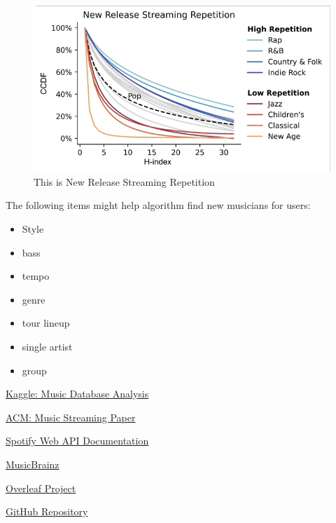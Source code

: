 \documentclass[runningheads]{llncs}
\begin{document}
\begin{figure}
\includegraphics[width=\textwidth]{Streaming 1.jpg}
\caption{This is New Release Streaming Repetition} 
\label{mecFig}
\end{figure}

%
%


The following items might help algorithm find new musicians for users:
\begin{itemize}
    \item Style
    \item bass
    \item tempo
    \item genre
    \item tour lineup
    \item single artist
    \item group
\end{itemize}
    

%
%



\href{https://www.kaggle.com/code/caitlyna/music-database-analysis}{Kaggle: Music Database Analysis}

\href{https://dl.acm.org/doi/fullHtml/10.1145/3614419.3644002}{ACM: Music Streaming Paper}

\href{https://developer.spotify.com/documentation/web-api}{Spotify Web API Documentation}

\href{https://musicbrainz.org/}{MusicBrainz}

\href{https://www.overleaf.com/project/671af4c6d1ae0a41998555c6}{Overleaf Project}

\href{https://github.com/anythonyschomer/capstoneproject}{GitHub Repository}
\end{document}
